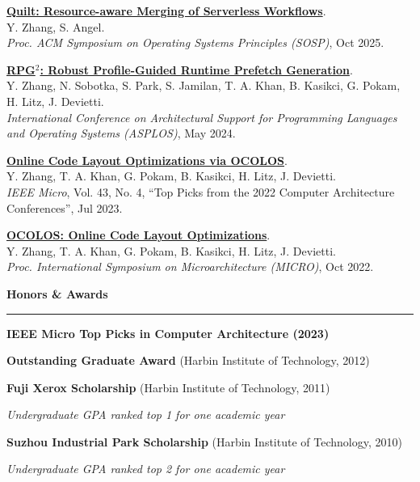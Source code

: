 \documentclass[10pt,letterpaper]{article}
\newcommand{\roottitle}[1]{\vspace{0.75em}\noindent\textbf{\large #1}\par\vspace{0.25em}\hrule\vspace{0.6em}}
\newcommand{\headedsection}[3]{\noindent #1\hfill #2\par #3\par}
\newcommand{\headedsubsection}[3]{\noindent \textit{#1}\hfill #2\par #3\par}
\begin{document}
\headedsection{\href{https://dl.acm.org/doi/10.1145/3731569.3764830}{\textbf{Quilt: Resource-aware Merging of Serverless Workflows}}.\\
Y. Zhang, S. Angel.\\
\textit{Proc. ACM Symposium on Operating Systems Principles (SOSP)}, Oct 2025.}{}{}

\headedsection{\href{https://dl.acm.org/doi/10.1145/3620665.3640396}{\textbf{RPG$^2$: Robust Profile-Guided Runtime Prefetch Generation}}.\\
Y. Zhang, N. Sobotka, S. Park, S. Jamilan, T. A. Khan, B. Kasikci, G. Pokam, H. Litz, J. Devietti.\\
\textit{International Conference on Architectural Support for Programming Languages and Operating Systems (ASPLOS)}, May 2024.}{}{}

\headedsection{\href{https://dl.acm.org/doi/abs/10.1109/MM.2023.3274758}{\textbf{Online Code Layout Optimizations via OCOLOS}}.\\
Y. Zhang, T. A. Khan, G. Pokam, B. Kasikci, H. Litz, J. Devietti.\\
\textit{IEEE Micro}, Vol. 43, No. 4, ``Top Picks from the 2022 Computer Architecture Conferences'', Jul 2023.}{}{}

\headedsection{\href{https://dl.acm.org/doi/abs/10.1109/MICRO56248.2022.00045}{\textbf{OCOLOS: Online Code Layout Optimizations}}.\\
Y. Zhang, T. A. Khan, G. Pokam, B. Kasikci, H. Litz, J. Devietti.\\
\textit{Proc. International Symposium on Microarchitecture (MICRO)}, Oct 2022.}{}{}

\roottitle{Honors \& Awards}

\headedsection{\textbf{IEEE Micro Top Picks in Computer Architecture (2023)}}{}{}

\headedsection{\textbf{Outstanding Graduate Award} (Harbin Institute of Technology, 2012)}{}{}

\headedsection{\textbf{Fuji Xerox Scholarship} (Harbin Institute of Technology, 2011)}{}{
  \headedsubsection{Undergraduate GPA ranked top 1 for one academic year}{}{}
}

\headedsection{\textbf{Suzhou Industrial Park Scholarship} (Harbin Institute of Technology, 2010)}{}{
  \headedsubsection{Undergraduate GPA ranked top 2 for one academic year}{}{}
}
\end{document}
